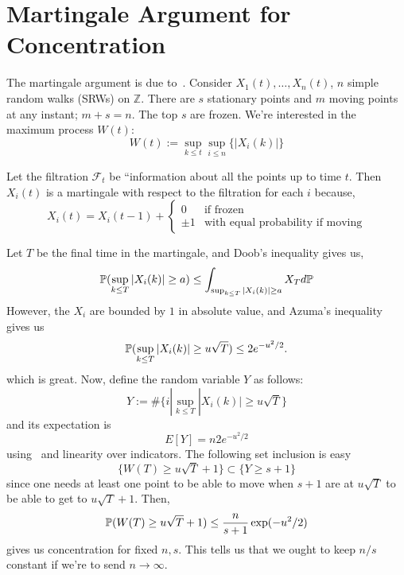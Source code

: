 \section*{Martingale Argument for Concentration}
The martingale argument is due to~\cite{lovett2012}. Consider $X_1(t), \ldots, X_n(t)$, $n$ simple random walks (SRWs) on $\mathbb{Z}$. There are $s$ stationary points and $m$ moving points at any instant; $m+s=n$. The top $s$ are frozen. We're interested in the maximum process $W(t)$:
\begin{equation}
  W(t) := \sup_{k \leq t} \sup_{i \leq n} \{ |X_i(k)| \}
  \label{eq:max-process-defn}
\end{equation}

Let the filtration $\mathcal{F}_t$ be ``information about all the points up to time $t$. Then $X_i(t)$ is a martingale with respect to the filtration for each $i$ because,
\begin{equation}
  X_i(t) = X_i(t-1) + \left\{ 
    \begin{array}{cc} 
      0 & \textrm{if frozen} \\
      \pm 1 & \textrm{with equal probability if moving}  
    \end{array} \right.
\end{equation}

Let $T$ be the final time in the martingale, and Doob's inequality gives us,
\begin{equation}
  \mathbb{P}(\sup_{k \leq T} |X_i(k)| \geq a) \leq \int_{\sup_{k \leq T} |X_i(k)| \geq a} X_T d\mathbb{P}
  \label{eq:doob-for-martingale}
\end{equation}
However, the $X_i$ are bounded by $1$ in absolute value, and Azuma's inequality gives us 
\begin{equation}
  \mathbb{P}(\sup_{k \leq T} |X_i(k)| \geq u\sqrt{T}) \leq 2 e^{-u^2/2}.
  \label{eq:azuma-improving-doob}
\end{equation}
which is great. Now, define the random variable $Y$ as follows: 
\begin{equation}
  Y := \# \{i | \sup_{k \leq T} |X_i(k)| \geq u\sqrt{T} \}
\end{equation}
and its expectation is
\begin{equation}
  E[Y] = n 2 e^{-u^2/2}
\end{equation} using~ and linearity over indicators. The following set inclusion is easy
\begin{equation}
  \{ W(T) \geq u\sqrt{T} + 1 \} \subset \{ Y \geq s+1 \}
\end{equation}
since one needs at least one point to be able to move when $s+1$ are at $u\sqrt{T}$ to be able to get to $u\sqrt{T}+1$. Then,
\begin{equation}
  \mathbb{P} (W(T) \geq u\sqrt{T} + 1) \leq \frac{n}{s+1} \exp(-u^2/2)
  \label{eq:concentration-for-w}
\end{equation}
gives us concentration for fixed $n,s$. This tells us that we ought to keep $n/s$ constant if we're to send $n \to \infty$.
